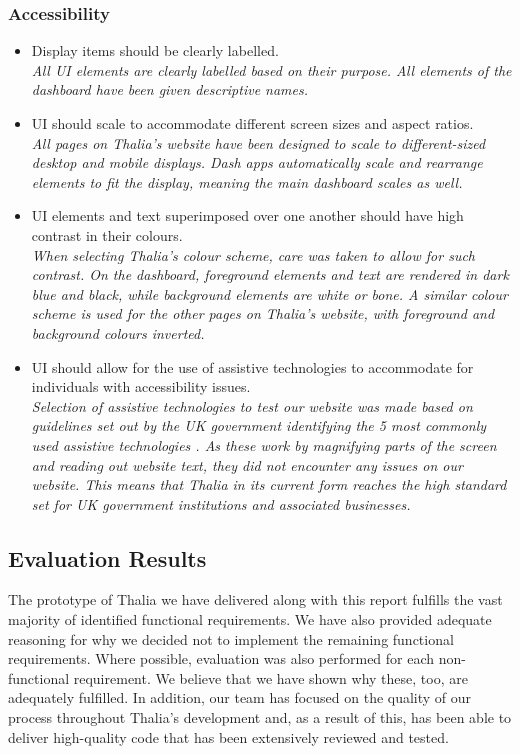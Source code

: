 \documentclass[main.tex]{subfiles}
\begin{document}
\subsubsection{Accessibility}
\begin{itemize}
    \item Display items should be clearly labelled.\\
    \textit{All UI elements are clearly labelled based on their purpose. All elements of the dashboard have been given descriptive names.}
    \item UI should scale to accommodate diﬀerent screen sizes and aspect ratios.\\
    \textit{All pages on Thalia's website have been designed to scale to different-sized desktop and mobile displays. Dash apps automatically scale and rearrange elements to fit the display, meaning the main dashboard scales as well.}
    \item UI elements and text superimposed over one another should have high contrast in their colours.\\
    \textit{When selecting Thalia’s colour scheme, care was taken to allow for such contrast. On the dashboard, foreground elements and text are rendered in dark blue and black, while background elements are white or bone. A similar colour scheme is used for the other pages on Thalia’s website, with foreground and background colours inverted.}
    
    \item UI should allow for the use of assistive technologies to accommodate for individuals with accessibility issues.\\
    \textit{Selection of assistive technologies to test our website was made based on guidelines set out by the UK government identifying the 5 most commonly used assistive technologies \cite{govUKAccessability}. As these work by magnifying parts of the screen and reading out website text, they did not encounter any issues on our website. This means that Thalia in its current form reaches the high standard set for UK government institutions and associated businesses.}

\end{itemize}

\subsection{Evaluation Results}
    The prototype of Thalia we have delivered along with this report fulfills the vast majority of identified functional requirements. We have also provided adequate reasoning for why we decided not to implement the remaining functional requirements. Where possible, evaluation was also performed for each non-functional requirement. We believe that we have shown why these, too, are adequately fulfilled. In addition, our team has focused on the quality of our process throughout Thalia’s development and, as a result of this, has been able to deliver high-quality code that has been extensively reviewed and tested. 
\end{document}

